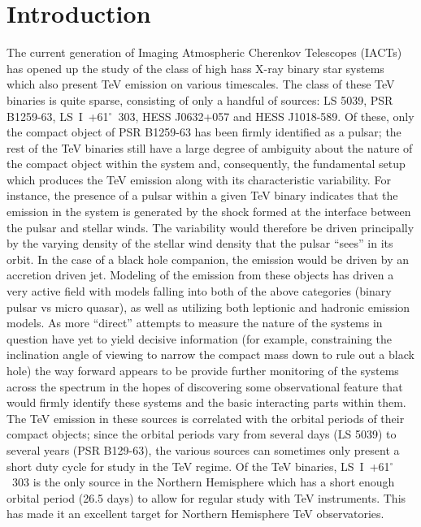 \documentclass[preprint2]{aastex}
\newcommand{\lsi}{LS~I~+61$^{\circ}$~303}
\begin{document}
\keywords{}

\section{Introduction}

The current generation of Imaging Atmospheric Cherenkov Telescopes (IACTs) has opened up the study of the class of high hass X-ray binary star systems which also present TeV emission on various timescales. The class of these TeV binaries is quite sparse, consisting of only a handful of sources: LS 5039, PSR B1259-63, \lsi{}, HESS J0632+057 and HESS J1018-589. Of these, only the compact object of PSR B1259-63 has been firmly identified as a pulsar; the rest of the TeV binaries still have a large degree of ambiguity about the nature of the compact object within the system and, consequently, the fundamental setup which produces the TeV emission along with its characteristic variability. For instance, the presence of a pulsar within a given TeV binary indicates that the emission in the system is generated by the shock formed at the interface between the pulsar and stellar winds. The variability would therefore be driven principally by the varying density of the stellar wind density that the pulsar ``sees'' in its orbit. In the case of a black hole companion, the emission would be driven by an accretion driven jet. Modeling of the emission from these objects has driven a very active field with models falling into both of the above categories (binary pulsar vs micro quasar), as well as utilizing both leptionic and hadronic emission models. As more ``direct'' attempts to measure the nature of the systems in question have yet to yield decisive information (for example, constraining the inclination angle of viewing to narrow the compact mass down to rule out a black hole) the way forward appears to be provide further monitoring of the systems across the spectrum in the hopes of discovering some observational feature that would firmly identify these systems and the basic interacting parts within them. The TeV emission in these sources is correlated with the orbital periods of their compact objects; since the orbital periods vary from several days (LS 5039) to several years (PSR B129-63), the various sources can sometimes only present a short duty cycle for study in the TeV regime. Of the TeV binaries, \lsi{} is the only source in the Northern Hemisphere which has a short enough orbital period (26.5 days) to allow for regular study with TeV instruments. This has made it an excellent target for Northern Hemisphere TeV observatories. 
\end{document}
